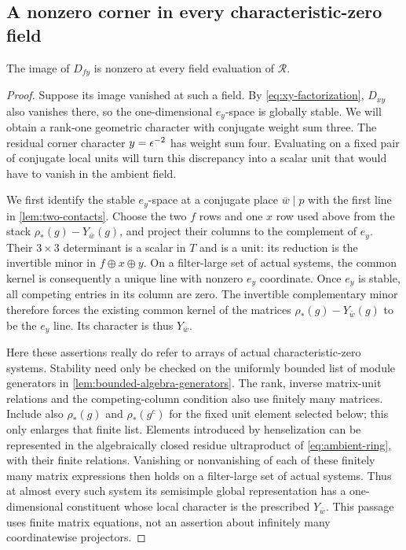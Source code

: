 \subsection{A nonzero corner in every characteristic-zero field}

\begin{lemma}
\label{lem:no-stable-y-line}
The image of $D_{fy}$ is nonzero at every field evaluation of
$\mathcal R$.
\end{lemma}

\begin{proof}
Suppose its image vanished at such a field.  By
\cref{eq:xy-factorization}, $D_{xy}$ also vanishes there, so the
one-dimensional $e_y$-space is globally stable.
We will obtain a rank-one geometric character with conjugate weight
sum three.  The residual corner character $y=\epsilon^{-2}$ has
weight sum four.  Evaluating on a fixed pair of conjugate local units
will turn this discrepancy into a scalar unit that would have to
vanish in the ambient field.

We first identify the stable $e_y$-space at a conjugate place
$\bar w\mid p$ with the
first line in \cref{lem:two-contacts}.  Choose the two $f$ rows and
one $x$ row used above from the stack
$\rho_*(g)-Y_{\bar w}(g)$, and project their columns to the complement
of $e_y$.  Their $3\times3$ determinant is a scalar in $T$ and is
a unit: its reduction is the invertible minor in
$f\oplus x\oplus y$.  On a filter-large set of actual systems, the common kernel
is consequently a unique line with nonzero $e_y$ coordinate.  Once
$e_y$ is stable, all competing entries in its column are zero.
The invertible complementary minor therefore forces the existing
common kernel of the matrices $\rho_*(g)-Y_{\bar w}(g)$ to be
the $e_y$ line.  Its character is thus $Y_{\bar w}$.

Here these assertions really do refer to arrays of actual
characteristic-zero systems.  Stability need only be checked on
the uniformly bounded list of module generators in
\cref{lem:bounded-algebra-generators}.  The rank, inverse matrix-unit
relations and the competing-column condition also use finitely
many matrices.  Include also $\rho_*(g)$ and $\rho_*(g^c)$ for
the fixed unit element selected below; this only enlarges that
finite list.  Elements introduced by henselization can be
represented in the algebraically closed residue ultraproduct of
\cref{eq:ambient-ring}, with their finite relations.  Vanishing or
nonvanishing of each of these finitely many matrix expressions then
holds on a filter-large set of actual systems.  Thus at almost every
such system its semisimple global representation has a
one-dimensional constituent whose local character is the prescribed
$Y_{\bar w}$.  This passage uses finite matrix equations, not an
assertion about infinitely many coordinatewise projectors.


\end{proof}
